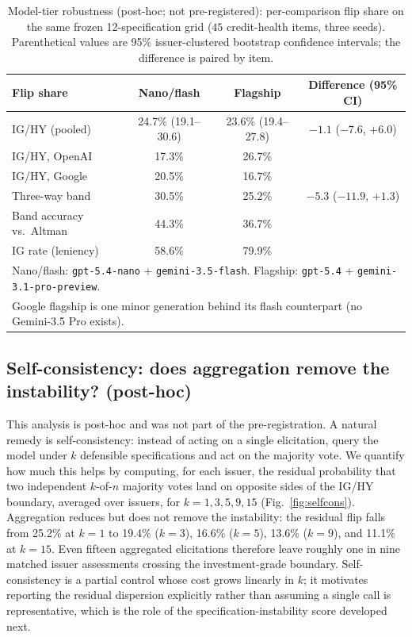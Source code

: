 \documentclass[a4paper,fleqn]{cas-sc}
\begin{document}
\begin{table}[t]\centering
\caption{Model-tier robustness (post-hoc; not pre-registered): per-comparison flip share on the same
frozen 12-specification grid ($45$ credit-health items, three seeds). Parenthetical values are 95\%
issuer-clustered bootstrap confidence intervals; the difference is paired by item.}
\label{tab:tier}
\begin{tabular}{lccc}\toprule
Flip share & Nano/flash & Flagship & Difference (95\% CI) \\\midrule
IG/HY (pooled) & 24.7\% (19.1--30.6) & 23.6\% (19.4--27.8) & $-1.1$ ($-7.6$, $+6.0$) \\
\quad IG/HY, OpenAI & 17.3\% & 26.7\% & \\
\quad IG/HY, Google & 20.5\% & 16.7\% & \\
Three-way band & 30.5\% & 25.2\% & $-5.3$ ($-11.9$, $+1.3$) \\\midrule
Band accuracy vs.\ Altman & 44.3\% & 36.7\% & \\
IG rate (leniency) & 58.6\% & 79.9\% & \\\midrule
\multicolumn{4}{l}{Nano/flash: \texttt{gpt-5.4-nano} + \texttt{gemini-3.5-flash}. Flagship: \texttt{gpt-5.4} + \texttt{gemini-3.1-pro-preview}.}\\
\multicolumn{4}{l}{Google flagship is one minor generation behind its flash counterpart (no Gemini-3.5 Pro exists).}\\\bottomrule
\end{tabular}\end{table}

\subsection{Self-consistency: does aggregation remove the instability? (post-hoc)}\label{sec:selfcons}
This analysis is post-hoc and was not part of the pre-registration. A natural remedy is self-consistency: instead of acting on a single elicitation, query the model under
$k$ defensible specifications and act on the majority vote. We quantify how much this helps by computing,
for each issuer, the residual probability that two independent $k$-of-$n$ majority votes land on opposite
sides of the IG/HY boundary, averaged over issuers, for $k=1,3,5,9,15$ (Fig.~\ref{fig:selfcons}).
Aggregation reduces but does not remove the instability: the residual flip falls from 25.2\% at $k=1$ to
19.4\% ($k=3$), 16.6\% ($k=5$), 13.6\% ($k=9$), and 11.1\% at $k=15$. Even fifteen aggregated
elicitations therefore leave roughly one in nine matched issuer assessments crossing the
investment-grade boundary. Self-consistency is a partial control whose cost grows linearly in $k$; it
motivates reporting the residual dispersion explicitly rather than assuming a single call is
representative, which is the role of the specification-instability score developed next.
\end{document}
